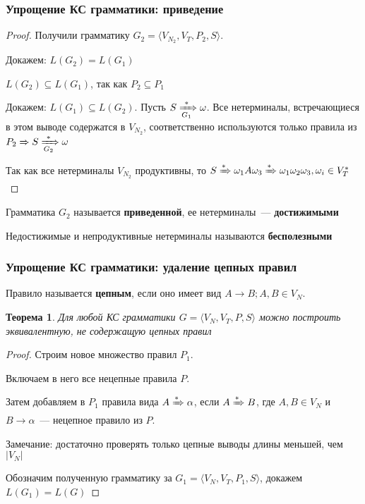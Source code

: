 \documentclass{beamer}
\newtheorem{rutheorem}{Теорема}
\newcommand{\derives}[1][*]{\xRightarrow[]{#1}}
\newcommand{\deriveg}[1]{\xRightarrow[#1]{*}}
\begin{document}
\begin{frame}[fragile]
  \transwipe[direction=90]
  \frametitle{Упрощение КС грамматики: приведение}
   \begin{proof}
   Получили грамматику $G_2 = \langle V_{N_2}, V_T, P_2, S\rangle$.

   Докажем: $L(G_2) = L(G_1)$

   $L(G_2) \subseteq L(G_1)$, так как $P_2 \subseteq P_1$

   Докажем: $L(G_1) \subseteq L(G_2)$. Пусть $S \deriveg{G_1} \omega$. Все нетерминалы, встречающиеся в этом выводе содержатся в $V_{N_2}$, соответственно используются только правила из $ P_2 \derives[] S \deriveg{G_2} \omega $

   Так как все нетерминалы $V_{N_2}$ продуктивны, то  $S \derives \omega_1 A \omega_3 \derives \omega_1 \omega_2 \omega_3, \omega_i \in V_T^*$


   \end{proof}

   Грамматика $G_2$ называется \textbf{приведенной}, ее нетерминалы~--- \textbf{достижимыми}

   Недостижимые и непродуктивные нетерминалы называются \textbf{бесполезными}
\end{frame}

\begin{frame}[fragile]
  \transwipe[direction=90]
  \frametitle{Упрощение КС грамматики: удаление цепных правил}
  Правило называется \textbf{цепным}, если оно имеет вид $A \to B; A, B \in V_N$.

  \begin{rutheorem}
    Для любой КС грамматики $G=\langle V_N, V_T, P, S \rangle$ можно построить эквивалентную, не содержащую цепных правил
  \end{rutheorem}

   \begin{proof}
   Строим новое множество правил $P_1$.

   Включаем в него все нецепные правила  $P$.

   Затем добавляем в $P_1$ правила вида $A \derives \alpha$, если $A \derives B$, где $A, B \in V_N$ и $B \to \alpha$~--- нецепное правило из $P$.

   Замечание: достаточно проверять только цепные выводы длины меньшей, чем $|V_N|$

   Обозначим полученную грамматику за $G_1=\langle V_N, V_T, P_1, S \rangle$, докажем $L(G_1)=L(G)$
      \end{proof}
\end{frame}
\end{document}
